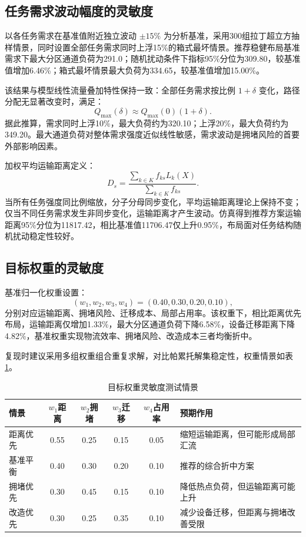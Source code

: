 \documentclass[12pt,a4paper]{article}
\begin{document}
	\subsection{任务需求波动幅度的灵敏度}
	以各任务需求在基准值附近独立波动 $\pm 15\%$ 为分析基准，采用300组拉丁超立方抽样情景，同时设置全部任务需求同时上浮15\%的箱式最坏情景。推荐稳健布局基准需求下最大分区通道负荷为291.0；随机扰动条件下指标95\%分位为309.80，较基准值增加6.46\%；箱式最坏情景最大负荷为334.65，较基准值增加15.00\%。
	
	该结果与模型线性流量叠加特性保持一致：全部任务需求按比例 $1+\delta$ 变化，路径分配无显著改变时，满足：
	\[
	Q_{\max}(\delta)\approx Q_{\max}(0)(1+\delta).
	\]
	据此推算，需求同时上浮10\%，最大负荷约为320.10；上浮20\%，最大负荷约为349.20。最大通道负荷对整体需求强度近似线性敏感，需求波动是拥堵风险的首要外部影响因素。
	
	加权平均运输距离定义：
	\[
	D_{s}=\frac{\sum_{k\in K} f_{ks} L_{k}(X)}{\sum_{k\in K} f_{ks}}.
	\]
	当所有任务强度同比例缩放，分子分母同步变化，平均运输距离理论上保持不变；仅当不同任务需求发生非同步变化，运输距离才产生波动。仿真得到推荐方案运输距离95\%分位为11817.42，相比基准值11706.47仅上升0.95\%，布局面对任务结构随机扰动稳定性较好。
	
	\subsection{目标权重的灵敏度}
	基准归一化权重设置：
	\[
	(w_1,w_2,w_3,w_4)=(0.40,0.30,0.20,0.10),
	\]
	分别对应运输距离、拥堵风险、迁移成本、局部占用率。该权重下，相比距离优先布局，运输距离仅增加1.33\%，最大分区通道负荷下降6.58\%，设备迁移距离下降4.82\%，基准权重实现物流效率、拥堵风险、改造成本三者均衡折中。
	
	复现时建议采用多组权重组合重复求解，对比帕累托解集稳定性，权重情景如表\ref{tab:weight_sensitivity}。
	
	\begin{table}[htbp]
		\centering
		\caption{目标权重灵敏度测试情景}
		\label{tab:weight_sensitivity}
		\begin{tabular}{lccccl}
			\toprule
			情景 & $w_1$距离 & $w_2$拥堵 & $w_3$迁移 & $w_4$占用率 & 预期作用 \\
			\midrule
			距离优先 & 0.55 & 0.25 & 0.15 & 0.05 & 缩短运输距离，但可能形成局部汇流 \\
			基准平衡 & 0.40 & 0.30 & 0.20 & 0.10 & 推荐的综合折中方案 \\
			拥堵优先 & 0.30 & 0.45 & 0.15 & 0.10 & 降低热点负荷，但运输距离可能上升 \\
			改造优先 & 0.30 & 0.25 & 0.35 & 0.10 & 减少设备迁移，但距离与拥堵改善受限 \\
			\bottomrule
		\end{tabular}
	\end{table}
	
\end{document}
